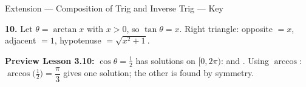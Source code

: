 \documentclass[10pt]{article}
\begin{document}
\vspace{0.08in}

\begin{extensionbox}{Extension --- Composition of Trig and Inverse Trig --- Key}

\textbf{10.} Let $\theta = \arctan x$ with $x > 0$, so $\tan\theta = x$.
Right triangle: opposite $= x$, adjacent $= 1$, hypotenuse $= \sqrt{x^2+1}$.


\vspace{0.06in}

\textbf{Preview Lesson 3.10:} $\cos\theta = \tfrac{1}{2}$ has
 solutions on $[0,2\pi)$:  and
.
Using $\arccos$: $\arccos\!\bigl(\tfrac{1}{2}\bigr) = \dfrac{\pi}{3}$ gives one solution;
the other is found by symmetry.

\end{extensionbox}
\end{document}
